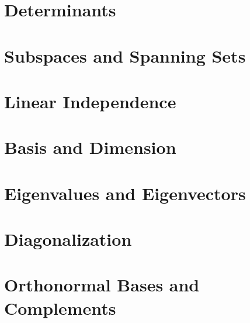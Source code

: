 \documentclass[12pt]{book}
\newcommand{\1}{{\mathrm 1\hspace*{-0.4ex}%
\rule{0.1ex}{1.52ex}\hspace*{0.2ex}}}
\begin{document}
\section{Determinants}

%

%
%

%

%

%
%


%
%
%

%
\section{Subspaces and Spanning Sets}

%

%

%
\section{Linear Independence}

%

%


\section{Basis and Dimension}

%

%


\section{Eigenvalues and Eigenvectors}
%
%
%

%

%

%

%


\section{Diagonalization}
%

%

%


\section{Orthonormal Bases and Complements}
%

%
\end{document}
